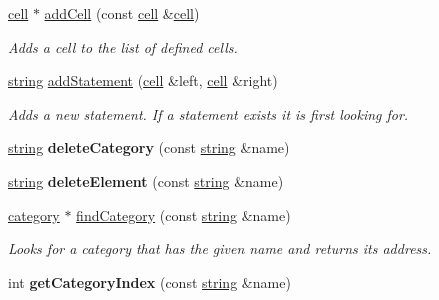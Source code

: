 \begin{DoxyCompactItemize}
\item 
\hyperlink{classmbdev__ontology_1_1cell}{cell} $\ast$ \hyperlink{classmbdev__ontology_1_1ontology_a7d7f23014828019de67edb9b3a2166bb}{add\-Cell} (const \hyperlink{classmbdev__ontology_1_1cell}{cell} \&\hyperlink{classmbdev__ontology_1_1cell}{cell})
\begin{DoxyCompactList}\small\item\em \-Adds a cell to the list of defined cells. \end{DoxyCompactList}\item 
\hypertarget{classmbdev__ontology_1_1ontology_a38f19c93a3f6e817dd617fe64598c35e}{\hyperlink{classmbdev_1_1string}{string} \hyperlink{classmbdev__ontology_1_1ontology_a38f19c93a3f6e817dd617fe64598c35e}{add\-Statement} (\hyperlink{classmbdev__ontology_1_1cell}{cell} \&left, \hyperlink{classmbdev__ontology_1_1cell}{cell} \&right)}\label{classmbdev__ontology_1_1ontology_a38f19c93a3f6e817dd617fe64598c35e}

\begin{DoxyCompactList}\small\item\em \-Adds a new statement. \-If a statement exists it is first looking for. \end{DoxyCompactList}\item 
\hypertarget{classmbdev__ontology_1_1ontology_ac8c5ca3059987b8bb4bb7e35bb7d27bc}{\hyperlink{classmbdev_1_1string}{string} {\bfseries delete\-Category} (const \hyperlink{classmbdev_1_1string}{string} \&name)}\label{classmbdev__ontology_1_1ontology_ac8c5ca3059987b8bb4bb7e35bb7d27bc}

\item 
\hypertarget{classmbdev__ontology_1_1ontology_ac923a46fd1212a4778f6ab77468376e3}{\hyperlink{classmbdev_1_1string}{string} {\bfseries delete\-Element} (const \hyperlink{classmbdev_1_1string}{string} \&name)}\label{classmbdev__ontology_1_1ontology_ac923a46fd1212a4778f6ab77468376e3}

\item 
\hypertarget{classmbdev__ontology_1_1ontology_a27de6b3b8c0507c9b5383b16cfc23552}{\hyperlink{classmbdev__ontology_1_1category}{category} $\ast$ \hyperlink{classmbdev__ontology_1_1ontology_a27de6b3b8c0507c9b5383b16cfc23552}{find\-Category} (const \hyperlink{classmbdev_1_1string}{string} \&name)}\label{classmbdev__ontology_1_1ontology_a27de6b3b8c0507c9b5383b16cfc23552}

\begin{DoxyCompactList}\small\item\em \-Looks for a category that has the given name and returns its address. \end{DoxyCompactList}\item 
\hypertarget{classmbdev__ontology_1_1ontology_aa77f2ba5499396a15c598e39ce86912c}{int {\bfseries get\-Category\-Index} (const \hyperlink{classmbdev_1_1string}{string} \&name)}\label{classmbdev__ontology_1_1ontology_aa77f2ba5499396a15c598e39ce86912c}


\end{DoxyCompactItemize}
